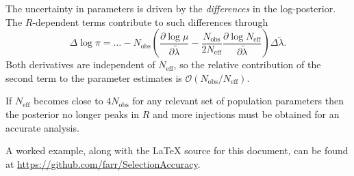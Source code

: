 \documentclass[modern]{aastex62}
\newcommand{\Neff}{N_\mathrm{eff}}
\newcommand{\Nobs}{N_\mathrm{obs}}
\begin{document}
The uncertainty in parameters is driven by the \emph{differences} in the
log-posterior.  The $R$-dependent terms contribute to such differences through
%
\begin{equation}
  \label{eq:pi-accuracy}
  \Delta \log \pi = \ldots - \Nobs \left( \frac{\partial \log \mu}{\partial \tilde{\lambda}} - \frac{\Nobs}{2 \Neff} \frac{\partial \log \Neff}{\partial \tilde{\lambda}} \right) \Delta \tilde{\lambda}.
\end{equation}
%
Both derivatives are independent of $\Neff$, so the relative contribution of the
second term to the parameter estimates is $\mathcal{O}\left( \Nobs / \Neff
\right)$.

If $\Neff$ becomes close to $4 \Nobs$ for any relevant set of population
parameters then the posterior no longer peaks in $R$ and more injections must be
obtained for an accurate analysis.

\acknowledgments

A worked example, along with the \LaTeX{} source for this document, can be found
at \url{https://github.com/farr/SelectionAccuracy}.


\end{document}
